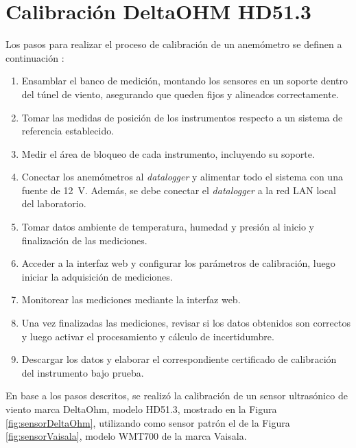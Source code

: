 \section{Calibración DeltaOHM HD51.3}\label{sec:calibDeltaOhm}

Los pasos para realizar el proceso de calibración de un anemómetro se definen a continuación \cite{ISO16622} \cite{IEC61400-12-1}  \cite{procedimientoSMNLaboratorio2024}:
\begin{enumerate}
    \item Ensamblar el banco de medición, montando los sensores en un soporte dentro del túnel de viento, asegurando que queden fijos y alineados correctamente.
    \item Tomar las medidas de posición de los instrumentos respecto a un sistema de referencia establecido.
    \item Medir el área de bloqueo de cada instrumento, incluyendo su soporte.
    \item Conectar los anemómetros al \textit{datalogger} y alimentar todo el sistema con una fuente de \SI{12}{V}. Además, se debe conectar el \textit{datalogger} a la red LAN local del laboratorio.
    \item Tomar datos ambiente de temperatura, humedad y presión al inicio y finalización de las mediciones.
    \item Acceder a la interfaz web y configurar los parámetros de calibración, luego iniciar la adquisición de mediciones.
    \item Monitorear las mediciones mediante la interfaz web.
    \item Una vez finalizadas las mediciones, revisar si los datos obtenidos son correctos y luego activar el procesamiento y cálculo de incertidumbre.
    \item Descargar los datos y elaborar el correspondiente certificado de calibración del instrumento bajo prueba.
\end{enumerate}



En base a los pasos descritos, se realizó la calibración de un sensor ultrasónico de viento marca DeltaOhm, modelo HD51.3, mostrado en la Figura \ref{fig:sensorDeltaOhm}, utilizando como sensor patrón el de la Figura \ref{fig:sensorVaisala}, modelo WMT700 de la marca Vaisala.

